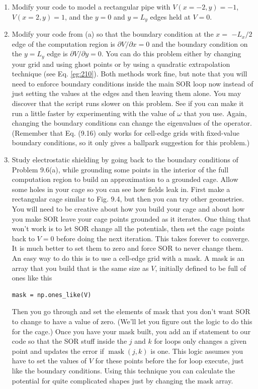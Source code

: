 \documentclass{book}
\theoremstyle{plain}
\theoremstyle{definition}
\numberwithin{exm}{chapter}
\theoremstyle{remark}
\theoremstyle{summary}
\theoremstyle{overview}
\begin{document}
\begin{enumerate}[label=(\alph*)]
\item Modify your code to model a rectangular pipe with $V(x=-2, y)=-1$, $V(x=2, y)=1$, and the $y=0$ and $y=L_{y}$ edges held at $V=0$.
\item Modify your code from (a) so that the boundary condition at the $x=$ $-L_{x} / 2$ edge of the computation region is $\partial V / \partial x=0$ and the boundary condition on the $y=L_{y}$ edge is $\partial V / \partial y=0$. You can do this problem either by changing your grid and using ghost points or by using a quadratic extrapolation technique (see Eq. \eqref{eg:210}). Both methods work fine, but note that you will need to enforce boundary conditions inside the main SOR loop now instead of just setting the values at the edges and then leaving them alone.
You may discover that the script runs slower on this problem. See if you can make it run a little faster by experimenting with the value of $\omega$ that you use. Again, changing the boundary conditions can change the eigenvalues of the operator. (Remember that Eq. (9.16) only works for cell-edge grids with fixed-value boundary conditions, so it only gives a ballpark suggestion for this problem.)
\item Study electrostatic shielding by going back to the boundary conditions of Problem 9.6(a), while grounding some points in the interior of the full computation region to build an approximation to a grounded cage. Allow some holes in your cage so you can see how fields leak in. First make a rectangular cage similar to Fig. 9.4, but then you can try other geometries.
You will need to be creative about how you build your cage and about how you make SOR leave your cage points grounded as it iterates. One thing that won\rq t work is to let SOR change all the potentials, then set the cage points back to $V=0$ before doing the next iteration. This takes forever to converge. It is much better to set them to zero and force SOR to never change them. An easy way to do this is to use a cell-edge grid with a mask. A mask is an array that you build that is the same size as $V$, initially defined to be full of ones like this
\begin{lstlisting}
mask = np.ones_like(V)
\end{lstlisting}
Then you go through and set the elements of mask that you don't want SOR to change to have a value of zero. (We'll let you figure out the logic to do this for the cage.) Once you have your mask built, you add an if statement to our code so that the SOR stuff inside the $j$ and $k$ for loops only changes a given point and updates the error if $\operatorname{mask}(j, k)$ is one. This logic assumes you have to set the values of $V$ for these points before the for loop execute, just like the boundary conditions. Using this technique you can calculate the potential for quite complicated shapes just by changing the mask array.

\end{enumerate}
\end{document}
